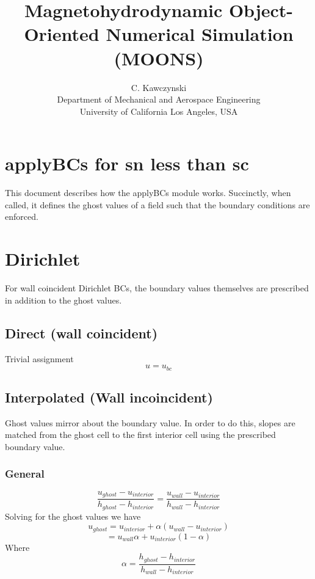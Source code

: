 \documentclass[11pt]{article}
\begin{document}
\doublespacing
\title{Magnetohydrodynamic Object-Oriented Numerical Simulation (MOONS)}
\author{C. Kawczynski \\
Department of Mechanical and Aerospace Engineering \\
University of California Los Angeles, USA\\
}
\maketitle

\section{applyBCs for sn less than sc}

This document describes how the applyBCs module works. Succinctly, when called, it defines the ghost values of a field such that the boundary conditions are enforced.

\section{Dirichlet}
For wall coincident Dirichlet BCs, the boundary values themselves are prescribed in addition to the ghost values.

\subsection{Direct (wall coincident)}
Trivial assignment
\begin{equation}
u = u_{bc}
\end{equation}

\subsection{Interpolated (Wall incoincident)}
Ghost values mirror about the boundary value. In order to do this, slopes are matched from the ghost cell to the first interior cell using the prescribed boundary value.

\subsubsection{General}
\begin{equation}
	\frac{u_{ghost}-u_{interior}}{h_{ghost}-h_{interior}}
	=
	\frac{u_{wall}-u_{interior}}{h_{wall}-h_{interior}}
\end{equation}
Solving for the ghost values we have
\begin{equation}
	u_{ghost}
	=
	u_{interior} + \alpha (u_{wall}-u_{interior})
\end{equation}
\begin{equation}
	=
	u_{wall}\alpha + u_{interior}(1-\alpha)
\end{equation}
Where
\begin{equation}
	\alpha = \frac{h_{ghost}-h_{interior}}{h_{wall}-h_{interior}}
\end{equation}
\end{document}
